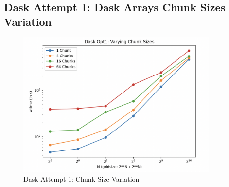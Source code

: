 \documentclass[a4paper,10pt]{article}
\begin{document}
\subsection{Dask Attempt 1: Dask Arrays Chunk Sizes Variation}
\begin{figure}[H]
  \centering
  \includegraphics[width=0.9\textwidth]{images/dask/dask_opt1_chunk_size.png}
  \caption{Dask Attempt 1: Chunk Size Variation}
  \label{fig:dask_opt1_chunk_size}
\end{figure}


\end{document}
